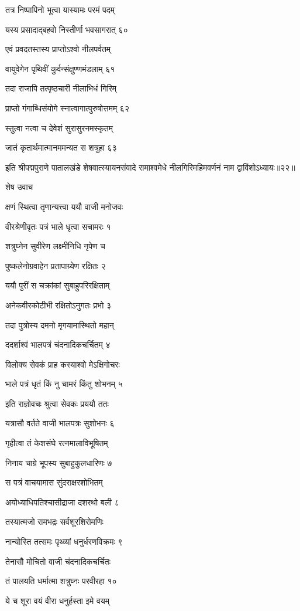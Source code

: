 तत्र निष्पापिनो भूत्वा यास्यामः परमं पदम्

यस्य प्रसादाद्बहवो निस्तीर्णा भवसागरात् ६०

एवं प्रवदतस्तस्य प्राप्तोऽश्वो नीलपर्वतम्

वायुवेगेन पृथिवीं कुर्वन्संक्षुण्णमंडलाम् ६१

तदा राजापि तत्पृष्ठचारी नीलाभिधं गिरिम्

प्राप्तो गंगाब्धिसंयोगे स्नात्वागात्पुरुषोत्तमम् ६२

स्तुत्वा नत्वा च देवेशं सुरासुरनमस्कृतम्

जातं कृतार्थमात्मानममन्यत स शत्रुहा ६३

इति श्रीपद्मपुराणे पातालखंडे शेषवात्स्यायनसंवादे रामाश्वमेधे नीलगिरिमहिमवर्णनं नाम द्वाविंशोऽध्यायः॥२२॥


शेष उवाच

क्षणं स्थित्वा तृणान्यत्त्वा ययौ वाजी मनोजवः

वीरश्रेणीवृतः पत्रं भाले धृत्वा सचामरः १

शत्रुघ्नेन सुवीरेण लक्ष्मीनिधि नृपेण च

पुष्कलेनोग्रवाहेन प्रतापाग्र्येण रक्षितः २

ययौ पुरीं स चक्रांकां सुबाहुपरिरक्षिताम्

अनेकवीरकोटीभी रक्षितोऽनुगतः प्रभो ३

तदा पुत्रोस्य दमनो मृगयामास्थितो महान्

ददर्शाश्वं भालपत्रं चंदनादिकचर्चितम् ४

विलोक्य सेवकं प्राह कस्याश्वो मेऽक्षिगोचरः

भाले पत्रं धृतं किं नु चामरं किंतु शोभनम् ५

इति राज्ञोवचः श्रुत्वा सेवकः प्रययौ ततः

यत्रासौ वर्तते वाजी भालपत्रः सुशोभनः ६

गृहीत्वा तं केशसंघे रत्नमालाविभूषितम्

निनाय चाग्रे भूपस्य सुबाहुकुलधारिणः ७

स पत्रं वाचयामास सुंदराक्षरशोभितम्

अयोध्याधिपतिश्चासीद्राजा दशरथो बली ८

तस्यात्मजो रामभद्रः सर्वशूरशिरोमणिः

नान्योस्ति तत्समः पृथ्व्यां धनुर्धरणविक्रमः ९

तेनासौ मोचितो वाजी चंदनादिकचर्चितः

तं पालयति धर्मात्मा शत्रुघ्नः परवीरहा १०

ये च शूरा वयं वीरा धनुर्हस्ता इमे वयम्

